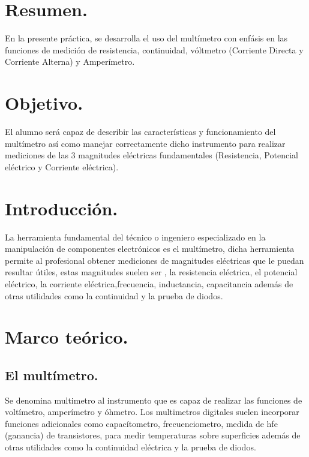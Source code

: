 \documentclass[10pt]{article}
\begin{document}
\tableofcontents
\newpage

\section{Resumen.}
En la presente práctica, se desarrolla el uso del multímetro con enfásis en las funciones de medición de resistencia, continuidad, vóltmetro (Corriente Directa y Corriente Alterna) y Amperímetro. 

\begin{multicols}{2}

\section{Objetivo.}

El alumno será capaz de describir las características y funcionamiento del multímetro así como manejar correctamente dicho instrumento para realizar mediciones de las 3 magnitudes eléctricas fundamentales (Resistencia, Potencial eléctrico y Corriente eléctrica).

\section{Introducción.}

La herramienta fundamental del técnico o ingeniero especializado en la manipulación de componentes electrónicos es el multímetro, dicha herramienta permite al profesional obtener mediciones de magnitudes eléctricas que le puedan resultar útiles,
estas magnitudes suelen ser , la resistencia eléctrica, el potencial eléctrico, la corriente eléctrica,frecuencia, inductancia, capacitancia además de otras utilidades como la continuidad y la prueba de diodos.

\section{Marco teórico.}

\subsection{El multímetro.}
Se denomina multimetro al instrumento que es capaz de realizar las funciones de voltímetro, amperímetro y óhmetro. Los multimetros digitales suelen incorporar funciones adicionales como capacítometro, frecuenciometro, medida de hfe (ganancia) de transistores, para medir 
temperaturas sobre superficies además de otras utilidades como la continuidad eléctrica y la prueba de diodos.


\end{multicols}
\end{document}
